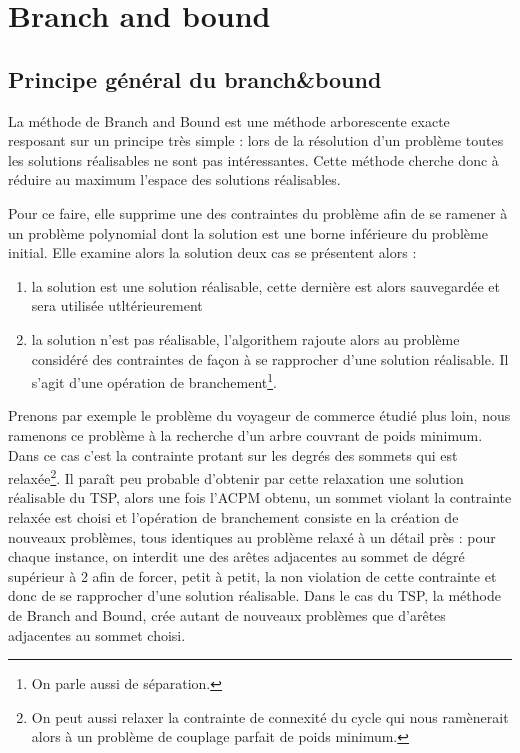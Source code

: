 
\section{Branch and bound}

\subsection{Principe général du branch\&bound}
La méthode de Branch and Bound est une méthode arborescente exacte resposant sur un principe très
simple : lors de la résolution d'un problème toutes les solutions réalisables ne sont pas
intéressantes. Cette méthode cherche donc à réduire au maximum l'espace des solutions réalisables.

Pour ce faire, elle supprime une des contraintes du problème afin de se ramener à un problème
polynomial dont la solution est une borne inférieure du problème initial. Elle examine alors la
solution deux cas se présentent alors : \begin{enumerate}
	\item la solution est une solution réalisable, cette dernière est alors sauvegardée et sera
		utilisée utltérieurement
	\item la solution n'est pas réalisable, l'algorithem rajoute alors au problème considéré des
		contraintes de façon à se rapprocher d'une solution réalisable. Il s'agit d'une opération de
		branchement\footnote{On parle aussi de séparation.}.
\end{enumerate}

Prenons par exemple le problème du voyageur de commerce étudié plus loin, nous ramenons ce problème
à la recherche d'un arbre couvrant de poids minimum. Dans ce cas c'est la contrainte protant sur les
degrés des sommets qui est relaxée\footnote{On peut aussi relaxer la contrainte de connexité du
cycle qui nous ramènerait alors à un problème de couplage parfait de poids minimum.}. Il paraît
peu probable d'obtenir par cette relaxation une solution réalisable du TSP, alors une fois l'ACPM
obtenu, un sommet violant la contrainte relaxée est choisi et l'opération de branchement consiste en
la création de nouveaux problèmes, tous identiques au problème relaxé à un détail près : pour chaque
instance, on interdit une des arêtes adjacentes au sommet de dégré supérieur à 2 afin de forcer,
petit à petit, la non violation de cette contrainte et donc de se rapprocher d'une solution
réalisable. Dans le cas du TSP, la méthode de Branch and Bound, crée autant de nouveaux problèmes
que d'arêtes adjacentes au sommet choisi.

